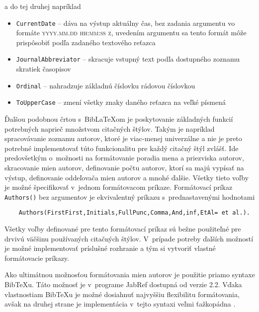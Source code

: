\documentclass{fithesis3}
\begin{document}
	\noindent a do tej druhej napríklad
	
	\begin{itemize}
	\item \texttt{CurrentDate} -- dáva na výstup aktuálny čas, bez zadania argumentu vo formáte \textsc{yyyy.mm.dd hh:mm:ss z}, uvedením argumentu sa tento formát môže prispôsobiť podľa zadaného textového reťazca
	\item \texttt{JournalAbbreviator} -- skracuje vstupný text podľa dostupného zoznamu skratiek časopisov
	\item \texttt{Ordinal} -- nahradzuje základnú číslovku rádovou číslovkou
	\item \texttt{ToUpperCase} -- zmení všetky znaky daného reťazca na veľké písmená
	\end{itemize}
	
	\noindent Ďalšou podobnou črtou s~BibLaTeXom je poskytovanie základných funkcií potrebných naprieč množstvom citačných štýlov. Takým je napríklad spracovávanie zoznamu autorov, ktoré je viac-menej univerzálne a nie je preto potrebné implementovať túto funkcionalitu pre každý citačný štýl zvlášť. Ide predovšetkým o~možnosti na formátovanie poradia mena a priezviska autorov, skracovanie mien autorov, definovanie počtu autorov, ktorí sa majú vypísať na výstup, definovanie oddeľovača mien autorov a mnohé ďalšie. Všetky tieto voľby je možné špecifikovať v~jednom formátovacom príkaze. Formátovací príkaz \texttt{Authors()} bez argumentov je ekvivalentný príkazu s~prednastavenými hodnotami
	
	\begin{verbatim}
	Authors(FirstFirst,Initials,FullPunc,Comma,And,inf,EtAl= et al.).
	\end{verbatim}
	
	\noindent Všetky voľby definované pre tento formátovací príkaz sú bežne použiteľné pre drvivú väčšinu používaných citačných štýlov. V~prípade potreby ďalších možností je možné implementovať príslušné rozhranie a tým si vytvoriť vlastné formátovacie príkazy.
	
	\noindent Ako ultimátnou možnosťou formátovania mien autorov je použitie priamo syntaxe BibTeXu. Táto možnosť je v~programe JabRef dostupná od verzie 2.2. Vďaka vlastnostiam BibTeXu je možné dosiahnuť najvyššiu flexibilitu formátovania, avšak na druhej strane je implementácia v~tejto syntaxi veľmi ťažkopádna \cite{JabRefCustomExportFilters}.
	
\end{document}
